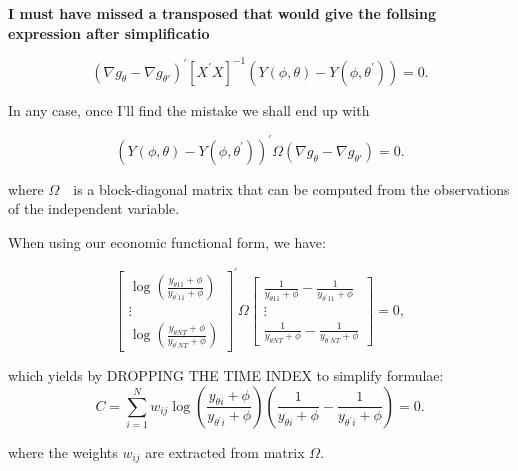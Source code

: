 \documentclass[a4paper,notitlepage,thmsb,11pt]{article}
\begin{document}
\bigskip 

\bigskip 

\textbf{I must have missed a transposed that would give the follsing
expression after simplificatio}\bigskip 

\begin{equation}
\left( \nabla g_{\theta }-\nabla g_{\theta \prime }\right) ^{\prime }\left[
X^{\prime }X\right] ^{-1}\left( Y(\phi ,\theta )-Y(\phi ,\theta ^{\prime
})\right) =0.
\end{equation}

In any case, once I'll find the mistake we shall end up with

\begin{equation}
\left( Y(\phi ,\theta )-Y(\phi ,\theta ^{\prime })\right) ^{\prime }\Omega
\left( \nabla g_{\theta }-\nabla g_{\theta \prime }\right) =0.
\end{equation}

where $\Omega $\ \ is a block-diagonal matrix that can be computed from the
observations of the independent variable.

When using our economic functional form, we have:

\begin{equation}
\left[ 
\begin{array}{c}
\log (\frac{y_{\theta 11}+\phi }{y_{\theta ^{\prime }11}+\phi }) \\ 
\vdots  \\ 
\log (\frac{y_{\theta NT}+\phi }{y_{\theta ^{\prime }NT}+\phi })%
\end{array}%
\right] ^{\prime }\Omega \left[ 
\begin{array}{c}
\frac{1}{y_{\theta 11}+\phi }-\frac{1}{y_{\theta ^{\prime }11}+\phi } \\ 
\vdots  \\ 
\frac{1}{y_{\theta NT}+\phi }-\frac{1}{y_{\theta ^{\prime }NT}+\phi }%
\end{array}%
\right] =0,
\end{equation}

which yields by DROPPING THE TIME INDEX to simplify formulae:%
\begin{equation}
C=\sum\limits_{i=1}^{N}w_{ij}\log (\frac{y_{\theta i}+\phi }{y_{\theta
^{\prime }i}+\phi })\left( \frac{1}{y_{\theta i}+\phi }-\frac{1}{y_{\theta
^{\prime }i}+\phi }\right) =0.  \label{explicit_focs}
\end{equation}

where the weights $w_{ij}$ are extracted from matrix $\Omega $. 
\end{document}

